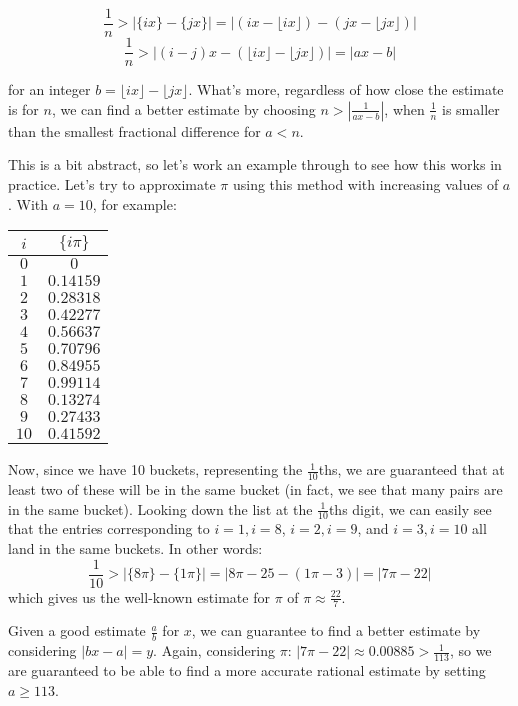 \documentclass{article}
\begin{document}
\[ \frac{1}{n} > |\{ix\}-\{jx\}| = | (ix-\lfloor ix \rfloor) - (jx - \lfloor jx \rfloor) | \]
\[ \frac{1}{n} > | (i-j)x - (\lfloor ix \rfloor - \lfloor jx \rfloor ) | = | ax-b | \]

for an integer $b = \lfloor ix \rfloor - \lfloor jx \rfloor$. What's more, regardless of how close
the estimate is for $n$, we can find a better estimate by choosing $n > |\frac{1}{ax-b}|$, when
$\frac{1}{n}$ is smaller than the smallest fractional difference for $a<n$.

This is a bit abstract, so let's work an example through to see how this works in practice. Let's try
to approximate $\pi$ using this method with increasing values of $a$. With $a=10$, for example:

\begin{center}
	\begin{tabular}{|c|c|}
		\hline
		$i$ & $\{i\pi\}$ \\
		\hline
		$0$ & $0$ \\
		$1$ & $0.14159$ \\
		$2$ & $0.28318$ \\
		$3$ & $0.42277$ \\
		$4$ & $0.56637$ \\
		$5$ & $0.70796$ \\
		$6$ & $0.84955$ \\
		$7$ & $0.99114$ \\
		$8$ & $0.13274$ \\
		$9$ & $0.27433$ \\
		$10$ & $0.41592$ \\
		\hline
	\end{tabular}
\end{center}

Now, since we have 10 buckets, representing the $\frac{1}{10}$ths, we are guaranteed that at
least two of these will be in the same bucket (in fact, we see that many pairs are in the same
bucket). Looking down the list at the $\frac{1}{10}$ths digit, we can easily see that the
entries corresponding to $i=1, i=8$, $i=2, i=9$, and $i=3, i=10$ all land in the same buckets.
In other words:
\[ \frac{1}{10}> |\{8\pi\}-\{1\pi\}| = | 8\pi - 25 - (1\pi - 3)| = |7\pi -22| \]
which gives us the well-known estimate for $\pi$ of $\pi \approx \frac{22}{7}$. 

Given a good estimate $\frac{a}{b}$ for $x$, we can guarantee to find a better estimate by 
considering $|bx-a| = y$. Again, considering $\pi$: $|7\pi - 22| \approx 0.00885 > 
\frac{1}{113}$, so we are guaranteed to be able to find a more accurate rational estimate by setting
$a \geq 113$.
\end{document}

